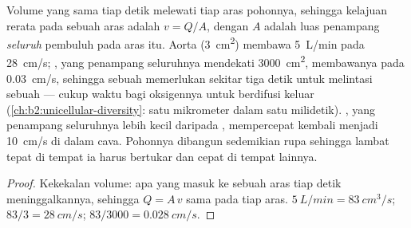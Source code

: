 \begin{theorem}\label{thm:b2:blood-circulation:continuity}
Volume yang sama tiap detik melewati tiap aras pohonnya, sehingga
kelajuan rerata pada sebuah aras adalah $v = Q/A$, dengan $A$ adalah
luas penampang \emph{seluruh} pembuluh pada aras itu. Aorta
(\qty{3}{cm^2}) membawa \qty{5}{L/min} pada \qty{28}{cm/s}; ,
yang penampang seluruhnya mendekati \qty{3000}{cm^2}, membawanya pada
\qty{0.03}{cm/s}, sehingga sebuah  memerlukan sekitar
tiga detik untuk melintasi sebuah  --- cukup waktu bagi
oksigennya untuk berdifusi keluar
(\cref{ch:b2:unicellular-diversity}: satu mikrometer dalam satu
milidetik). , yang penampang seluruhnya lebih kecil daripada
, mempercepat  kembali menjadi \qty{10}{cm/s} di
dalam  cava. Pohonnya dibangun sedemikian rupa sehingga 
lambat tepat di tempat ia harus bertukar dan cepat di tempat lainnya.
\end{theorem}
\begin{proof}
Kekekalan volume: apa yang masuk ke sebuah aras tiap detik
meninggalkannya, sehingga $Q = A\,v$ sama pada tiap aras. $\qty{5}{L/min} =
\qty{83}{cm^3/s}$; $83/3 = \qty{28}{cm/s}$; $83/3000 =
\qty{0.028}{cm/s}$.
\end{proof}

